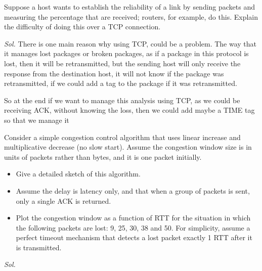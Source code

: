 \documentclass{assignment}
\begin{document}
\newpage
\begin{ex}
Suppose a host wants to establish the reliability of a link by sending packets and measuring
the percentage that are received; routers, for example, do this. Explain the difficulty of doing
this over a TCP connection.
\end{ex}
\textit{ Sol. }
There is one main reason why using TCP, could be a problem. The way that it
manages lost packages or broken packages, as if a package in this protocol is
lost, then it will be retransmitted, but the sending host will only receive the
response from the destination host, it will not know if the package was
retransmitted, if we could add a tag to the package if it was retransmitted.

So at the end if we want to manage this analysis using TCP, as we could be
receiving ACK, without knowing the loss, then we could add maybe a TIME tag so
that we manage it
\newpage
\begin{ex}
Consider a simple congestion control algorithm that uses linear increase and multiplicative
decrease (no slow start). Assume the congestion window size is in units of packets rather than
bytes, and it is one packet initially.
\begin{itemize}
\item Give a detailed sketch of this algorithm.
\item Assume the delay is latency only, and that when a group of packets is sent, only a single
ACK is returned.
\item Plot the congestion window as a function of RTT for the situation in which the following
packets are lost: 9, 25, 30, 38 and 50. For simplicity, assume a perfect timeout mechanism
that detects a lost packet exactly 1 RTT after it is transmitted. 
\end{itemize}
  
\end{ex}
\textit{ Sol. }
\end{document}
